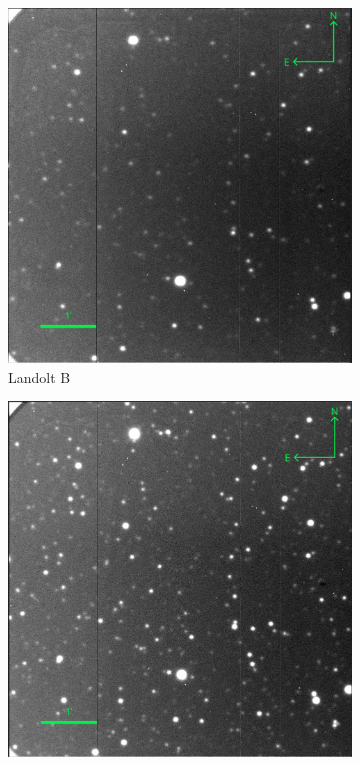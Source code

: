 \documentclass{article}
\begin{document}
    \begin{figure}
        \centering
        \begin{subfigure}[b]{0.475\textwidth}
            \centering
            \includegraphics[width=\textwidth]{landB_scale.png}
            \caption[Landolt B]%
            {{\small Landolt B}}    
            \label{fig:landB}
        \end{subfigure}
        \hfill
        \begin{subfigure}[b]{0.475\textwidth}  
            \centering 
            \includegraphics[width=\textwidth]{landV_scale.png}

\end{subfigure}
\end{figure}
\end{document}
